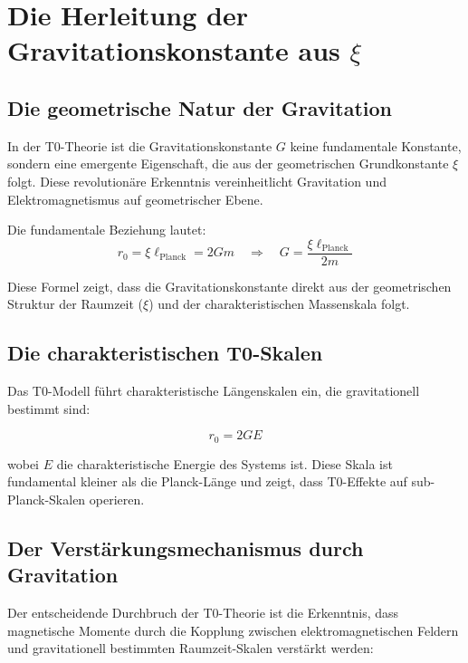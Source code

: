 \documentclass[12pt,a4paper]{article}
\theoremstyle{definition}
\begin{document}
	\section{Die Herleitung der Gravitationskonstante aus $\xi$}
	
	\subsection{Die geometrische Natur der Gravitation}
	
	In der T0-Theorie ist die Gravitationskonstante $G$ keine fundamentale Konstante, sondern eine emergente Eigenschaft, die aus der geometrischen Grundkonstante $\xi$ folgt. Diese revolutionäre Erkenntnis vereinheitlicht Gravitation und Elektromagnetismus auf geometrischer Ebene.
	
	Die fundamentale Beziehung lautet:
	\begin{equation}
		r_0 = \xi \ell_{\mathrm{Planck}} = 2Gm
		\quad \Rightarrow \quad 
		G = \frac{\xi \ell_{\mathrm{Planck}}}{2m}
	\end{equation}
	
	Diese Formel zeigt, dass die Gravitationskonstante direkt aus der geometrischen Struktur der Raumzeit ($\xi$) und der charakteristischen Massenskala folgt.
	
	\subsection{Die charakteristischen T0-Skalen}
	
	Das T0-Modell führt charakteristische Längenskalen ein, die gravitationell bestimmt sind:
	
	\begin{equation}
		r_0 = 2GE
	\end{equation}
	
	wobei $E$ die charakteristische Energie des Systems ist. Diese Skala ist fundamental kleiner als die Planck-Länge und zeigt, dass T0-Effekte auf sub-Planck-Skalen operieren.
	
	\subsection{Der Verstärkungsmechanismus durch Gravitation}
	
	Der entscheidende Durchbruch der T0-Theorie ist die Erkenntnis, dass magnetische Momente durch die Kopplung zwischen elektromagnetischen Feldern und gravitationell bestimmten Raumzeit-Skalen verstärkt werden:
	
\end{document}
